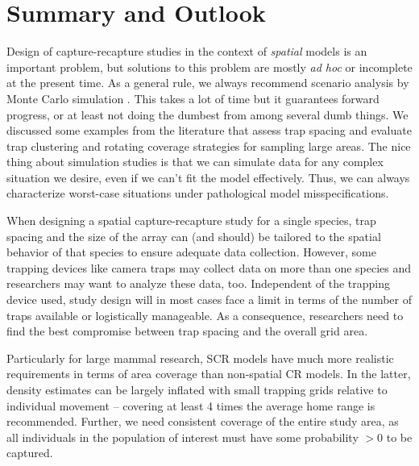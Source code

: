 \section {Summary and Outlook}
\label{design.sec.outlook}

Design of capture-recapture studies in the context of {\it spatial}
models is an important problem, but solutions to this problem are
mostly {\it ad hoc} or incomplete at the present time. As a general
rule, we always recommend scenario analysis by Monte Carlo simulation
\citep{efford_fewster:2012, sollmann_etal:2012, sun:2013}.  This takes
a lot of time but it guarantees forward progress, or at least not
doing the dumbest from among several dumb things.  We discussed some
examples from the literature that assess trap spacing and
evaluate trap clustering and rotating coverage strategies for sampling
large areas.  The nice thing about simulation studies is that we can
simulate data for any complex situation we desire, even if we can't
fit the model effectively. Thus, we can always characterize worst-case
situations under pathological model misspecifications.

When designing a spatial capture-recapture study for a single species, trap
spacing and the size of the array can (and should) be tailored to the
spatial behavior of that species to ensure adequate data
collection. However, some trapping devices like camera traps may
collect data on more than one species and researchers may want to
analyze these data, too. Independent of the trapping device used,
study design will in most cases face a limit in terms of the number of
traps available or logistically manageable. As a consequence,
researchers need to find the best compromise between trap spacing and
the overall grid area.

Particularly for large mammal research, SCR models have much more
realistic requirements in terms of area coverage than non-spatial CR
models. In the latter, density estimates can be largely inflated with
small trapping grids relative to individual movement
\citep{maffei_noss:2008} -- covering at least 4 times the average home
range is recommended. Further, we need consistent coverage of the
entire study area, as all individuals in the population of interest
must have some probability $>0$ to be captured.

